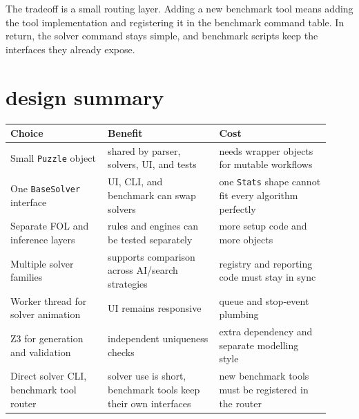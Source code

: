 \documentclass[11pt]{article}
\begin{document}
The tradeoff is a small routing layer. Adding a new benchmark tool means adding
the tool implementation and registering it in the benchmark command table. In
return, the solver command stays simple, and benchmark scripts keep the
interfaces they already expose.

\section{design summary}

\begin{table}[h]
\centering
\begin{tabular}{p{0.28\linewidth}p{0.32\linewidth}p{0.32\linewidth}}
\toprule
Choice & Benefit & Cost \\
\midrule
Small \texttt{Puzzle} object & shared by parser, solvers, UI, and tests & needs wrapper objects for mutable workflows \\
One \texttt{BaseSolver} interface & UI, CLI, and benchmark can swap solvers & one \texttt{Stats} shape cannot fit every algorithm perfectly \\
Separate FOL and inference layers & rules and engines can be tested separately & more setup code and more objects \\
Multiple solver families & supports comparison across AI/search strategies & registry and reporting code must stay in sync \\
Worker thread for solver animation & UI remains responsive & queue and stop-event plumbing \\
Z3 for generation and validation & independent uniqueness checks & extra dependency and separate modelling style \\
Direct solver CLI, benchmark tool router & solver use is short, benchmark tools keep their own interfaces & new benchmark tools must be registered in the router \\
\bottomrule
\end{tabular}
\end{table}
\end{document}
